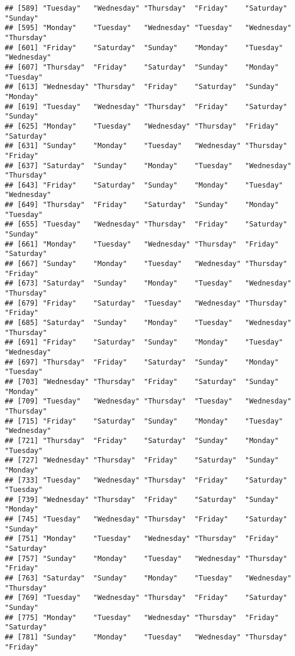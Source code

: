\documentclass[
]{article}
\begin{document}
\begin{verbatim}
## [589] "Tuesday"   "Wednesday" "Thursday"  "Friday"    "Saturday"  "Sunday"   
## [595] "Monday"    "Tuesday"   "Wednesday" "Tuesday"   "Wednesday" "Thursday" 
## [601] "Friday"    "Saturday"  "Sunday"    "Monday"    "Tuesday"   "Wednesday"
## [607] "Thursday"  "Friday"    "Saturday"  "Sunday"    "Monday"    "Tuesday"  
## [613] "Wednesday" "Thursday"  "Friday"    "Saturday"  "Sunday"    "Monday"   
## [619] "Tuesday"   "Wednesday" "Thursday"  "Friday"    "Saturday"  "Sunday"   
## [625] "Monday"    "Tuesday"   "Wednesday" "Thursday"  "Friday"    "Saturday" 
## [631] "Sunday"    "Monday"    "Tuesday"   "Wednesday" "Thursday"  "Friday"   
## [637] "Saturday"  "Sunday"    "Monday"    "Tuesday"   "Wednesday" "Thursday" 
## [643] "Friday"    "Saturday"  "Sunday"    "Monday"    "Tuesday"   "Wednesday"
## [649] "Thursday"  "Friday"    "Saturday"  "Sunday"    "Monday"    "Tuesday"  
## [655] "Tuesday"   "Wednesday" "Thursday"  "Friday"    "Saturday"  "Sunday"   
## [661] "Monday"    "Tuesday"   "Wednesday" "Thursday"  "Friday"    "Saturday" 
## [667] "Sunday"    "Monday"    "Tuesday"   "Wednesday" "Thursday"  "Friday"   
## [673] "Saturday"  "Sunday"    "Monday"    "Tuesday"   "Wednesday" "Thursday" 
## [679] "Friday"    "Saturday"  "Tuesday"   "Wednesday" "Thursday"  "Friday"   
## [685] "Saturday"  "Sunday"    "Monday"    "Tuesday"   "Wednesday" "Thursday" 
## [691] "Friday"    "Saturday"  "Sunday"    "Monday"    "Tuesday"   "Wednesday"
## [697] "Thursday"  "Friday"    "Saturday"  "Sunday"    "Monday"    "Tuesday"  
## [703] "Wednesday" "Thursday"  "Friday"    "Saturday"  "Sunday"    "Monday"   
## [709] "Tuesday"   "Wednesday" "Thursday"  "Tuesday"   "Wednesday" "Thursday" 
## [715] "Friday"    "Saturday"  "Sunday"    "Monday"    "Tuesday"   "Wednesday"
## [721] "Thursday"  "Friday"    "Saturday"  "Sunday"    "Monday"    "Tuesday"  
## [727] "Wednesday" "Thursday"  "Friday"    "Saturday"  "Sunday"    "Monday"   
## [733] "Tuesday"   "Wednesday" "Thursday"  "Friday"    "Saturday"  "Tuesday"  
## [739] "Wednesday" "Thursday"  "Friday"    "Saturday"  "Sunday"    "Monday"   
## [745] "Tuesday"   "Wednesday" "Thursday"  "Friday"    "Saturday"  "Sunday"   
## [751] "Monday"    "Tuesday"   "Wednesday" "Thursday"  "Friday"    "Saturday" 
## [757] "Sunday"    "Monday"    "Tuesday"   "Wednesday" "Thursday"  "Friday"   
## [763] "Saturday"  "Sunday"    "Monday"    "Tuesday"   "Wednesday" "Thursday" 
## [769] "Tuesday"   "Wednesday" "Thursday"  "Friday"    "Saturday"  "Sunday"   
## [775] "Monday"    "Tuesday"   "Wednesday" "Thursday"  "Friday"    "Saturday" 
## [781] "Sunday"    "Monday"    "Tuesday"   "Wednesday" "Thursday"  "Friday"   

\end{verbatim}
\end{document}
